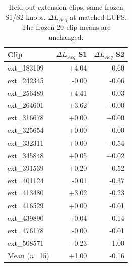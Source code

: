 \begin{table}[!htbp]
\centering
\caption{Held-out extension clips, same frozen S1/S2 knobs. $\Delta L_{Aeq}$ at matched LUFS. The frozen 20-clip means are unchanged.}
\label{tab:extension}
\renewcommand{\arraystretch}{1.08}
\begin{tabular}{l r r}
\hline
Clip & $\Delta L_{Aeq}$ S1 & $\Delta L_{Aeq}$ S2 \\
\hline
ext\_183109 & +4.04 & -0.60 \\
ext\_242345 & -0.00 & -0.06 \\
ext\_256489 & +4.41 & -0.03 \\
ext\_264601 & +3.62 & +0.00 \\
ext\_316678 & +0.00 & +0.00 \\
ext\_325654 & +0.00 & -0.00 \\
ext\_332311 & +0.00 & +0.54 \\
ext\_345848 & +0.05 & +0.02 \\
ext\_391539 & +0.20 & -0.52 \\
ext\_401124 & -0.01 & -0.37 \\
ext\_413480 & +3.02 & -0.23 \\
ext\_416529 & +0.00 & -0.01 \\
ext\_439890 & -0.04 & -0.14 \\
ext\_476178 & -0.00 & -0.01 \\
ext\_508571 & -0.23 & -1.00 \\
\hline
Mean ($n$=15) & +1.00 & -0.16 \\
\hline
\end{tabular}
\end{table}
